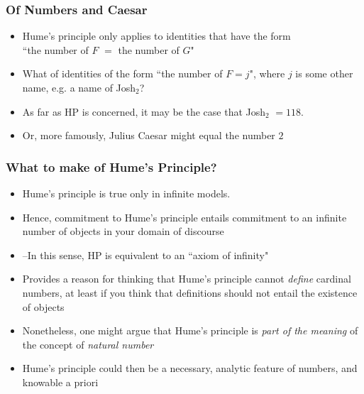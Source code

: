 \begin{frame}
\frametitle{Of Numbers and Caesar}

\begin{itemize}[<+->]

\item Hume's principle only applies to identities that have the form \\ ``the number of $F$ $=$ the number of $G$"

\item What of identities of the form ``the number of $F = j$", where $j$ is some other name, e.g. a name of Josh$_2$? 

\item As far as HP is concerned, it may be the case that Josh$_2$ $= 118$.  

\item Or, more famously, Julius Caesar might equal the number $2 $


\end{itemize}
\end{frame}


\begin{frame}
\frametitle{What to make of Hume's Principle?}

\begin{itemize}[<+->]

\item Hume's principle is true only in infinite models.

\item Hence, commitment to Hume's principle entails commitment to an infinite number of objects in your domain of discourse
\item[] --In this sense, HP is equivalent to an ``axiom of infinity"

\item Provides a reason for thinking that Hume's principle cannot \textit{define} cardinal numbers, at least if you think that definitions should not entail the existence of objects

\item Nonetheless, one might argue that Hume's principle is \textit{part of the meaning} of the concept of \textit{natural number}

\item Hume's principle could then be a necessary, analytic feature of numbers, and knowable a priori

\end{itemize}
\end{frame}

